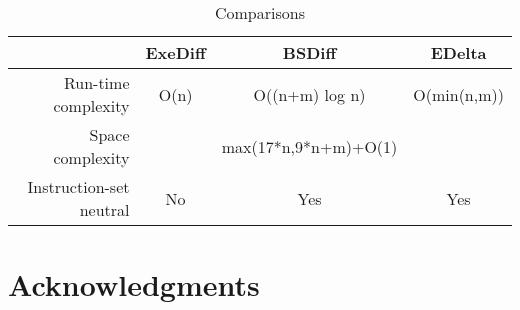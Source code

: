 \documentclass[10pt,twocolumn]{article}
\begin{document}
\begin{table*}
\begin{center}
\begin{tabular}{|r|c|c|c|}
\hline

                        & ExeDiff        &      BSDiff    & EDelta     \\

\hline
Run-time complexity     & O(n)           &   O((n+m) log n) & O(min(n,m))   \\  
Space complexity        &                & max(17*n,9*n+m)+O(1) &            \\
Instruction-set neutral & No             &  Yes           & Yes        \\
\hline

\end{tabular}
\caption{ \label{tab:comparisons} Comparisons}
\end{center}
\end{table*}



\section{Acknowledgments}

{\footnotesize
\citeindexfalse


\citeindextrue
}
\end{document}
